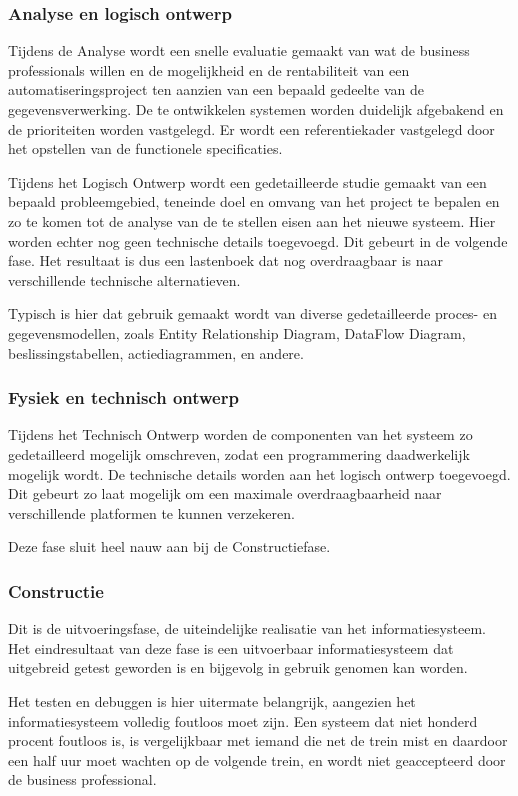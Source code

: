 \subsubsection{Analyse en logisch ontwerp}

Tijdens de Analyse wordt een snelle evaluatie gemaakt van wat de business professionals willen en de mogelijkheid en de rentabiliteit van een automatiseringsproject ten aanzien van een bepaald gedeelte van de gegevensverwerking. De te ontwikkelen systemen worden duidelijk afgebakend en de prioriteiten worden vastgelegd. Er wordt een referentiekader vastgelegd door het opstellen van de functionele specificaties.

Tijdens het Logisch Ontwerp wordt een gedetailleerde studie gemaakt van een bepaald probleemgebied, teneinde doel en omvang van het project te bepalen en zo te komen tot de analyse van de te stellen eisen aan het nieuwe systeem. Hier worden echter nog geen technische details toegevoegd. Dit gebeurt in de volgende fase. Het resultaat is dus een lastenboek dat nog overdraagbaar is naar verschillende technische alternatieven.

Typisch is hier dat gebruik gemaakt wordt van diverse gedetailleerde proces- en gegevensmodellen, zoals Entity Relationship Diagram, DataFlow Diagram, beslissingstabellen, actiediagrammen, en andere.

\subsubsection{Fysiek en technisch ontwerp}

Tijdens het Technisch Ontwerp worden de componenten van het systeem zo gedetailleerd mogelijk omschreven, zodat een programmering daadwerkelijk mogelijk wordt. De technische details worden aan het logisch ontwerp toegevoegd. Dit gebeurt zo laat mogelijk om een maximale overdraagbaarheid naar verschillende platformen te kunnen verzekeren.

Deze fase sluit heel nauw aan bij de Constructiefase.
\newpage
\subsubsection{Constructie}

Dit is de uitvoeringsfase, de uiteindelijke realisatie van het informatiesysteem. Het eindresultaat van deze fase is een uitvoerbaar informatiesysteem dat uitgebreid getest geworden is en bijgevolg in gebruik genomen kan worden.

Het testen en debuggen is hier uitermate belangrijk, aangezien het informatiesysteem volledig foutloos moet zijn. Een systeem dat niet honderd procent foutloos is, is vergelijkbaar met iemand die net de trein mist en daardoor een half uur moet wachten op de volgende trein, en wordt niet geaccepteerd door de business professional.

